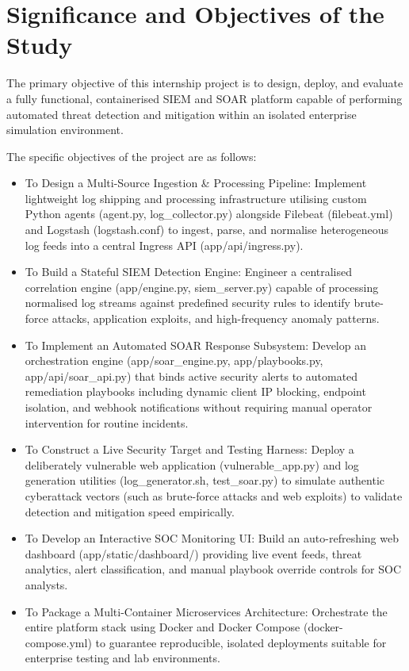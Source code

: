 \section{Significance and Objectives of the Study}

The primary objective of this internship project is to design, deploy, and evaluate a fully functional, containerised SIEM and SOAR platform capable of performing automated threat detection and mitigation within an isolated enterprise simulation environment.

The specific objectives of the project are as follows:

\begin{itemize}
  \item To Design a Multi-Source Ingestion \& Processing Pipeline: Implement lightweight log shipping and processing infrastructure utilising custom Python agents (agent.py, log\_collector.py) alongside Filebeat (filebeat.yml) and Logstash (logstash.conf) to ingest, parse, and normalise heterogeneous log feeds into a central Ingress API (app/api/ingress.py).
  \item To Build a Stateful SIEM Detection Engine: Engineer a centralised correlation engine (app/engine.py, siem\_server.py) capable of processing normalised log streams against predefined security rules to identify brute-force attacks, application exploits, and high-frequency anomaly patterns.
  \item To Implement an Automated SOAR Response Subsystem: Develop an orchestration engine (app/soar\_engine.py, app/playbooks.py, app/api/soar\_api.py) that binds active security alerts to automated remediation playbooks including dynamic client IP blocking, endpoint isolation, and webhook notifications without requiring manual operator intervention for routine incidents.
  \item To Construct a Live Security Target and Testing Harness: Deploy a deliberately vulnerable web application (vulnerable\_app.py) and log generation utilities (log\_generator.sh, test\_soar.py) to simulate authentic cyberattack vectors (such as brute-force attacks and web exploits) to validate detection and mitigation speed empirically.
  \item To Develop an Interactive SOC Monitoring UI: Build an auto-refreshing web dashboard (app/static/dashboard/) providing live event feeds, threat analytics, alert classification, and manual playbook override controls for SOC analysts.
  \item To Package a Multi-Container Microservices Architecture: Orchestrate the entire platform stack using Docker and Docker Compose (docker-compose.yml) to guarantee reproducible, isolated deployments suitable for enterprise testing and lab environments.
\end{itemize}


